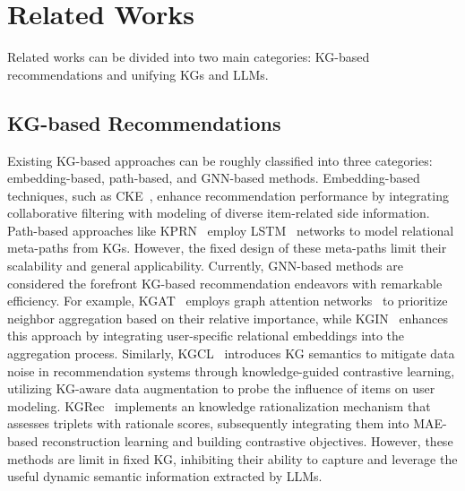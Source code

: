 \section{Related Works}
Related works can be divided into two main categories: KG-based recommendations and unifying KGs and LLMs.

\subsection{KG-based Recommendations}
Existing KG-based approaches can be roughly classified into three categories: embedding-based, path-based, and GNN-based methods. 
Embedding-based techniques, such as CKE~\cite{cke}, enhance recommendation performance by integrating collaborative filtering with modeling of diverse item-related side information.
Path-based approaches like KPRN~\cite{KPRN} employ LSTM~\cite{lstm} networks to model relational meta-paths from KGs. However, the fixed design of these meta-paths limit their scalability and general applicability.
Currently, GNN-based methods are considered the forefront KG-based recommendation endeavors with remarkable efficiency. For example, KGAT~\cite{kgat} employs graph attention networks~\cite{gat} to prioritize neighbor aggregation based on their relative importance, while KGIN~\cite{kgin} enhances this approach by integrating user-specific relational embeddings into the aggregation process. Similarly, KGCL~\cite{kgcl} introduces KG semantics to mitigate data noise in recommendation systems through knowledge-guided contrastive learning, utilizing KG-aware data augmentation to probe the influence of items on user modeling. KGRec~\cite{kgrec} implements an knowledge rationalization mechanism that assesses triplets with rationale scores, subsequently integrating them into MAE-based \cite{mae} reconstruction learning and building contrastive objectives. However, these methods are limit in fixed KG, inhibiting their ability to capture and leverage the useful dynamic semantic information extracted by LLMs.

